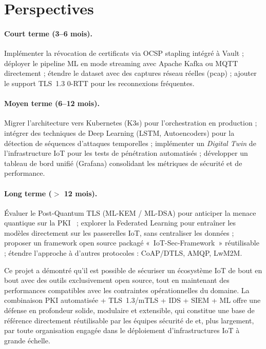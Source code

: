\section*{Perspectives}

\paragraph{Court terme (3--6 mois).}
Implémenter la révocation de certificats via OCSP stapling intégré à Vault ; déployer le pipeline ML en mode streaming avec Apache Kafka ou MQTT directement ; étendre le dataset avec des captures réseau réelles (pcap) ; ajouter le support TLS~1.3 0-RTT pour les reconnexions fréquentes.

\paragraph{Moyen terme (6--12 mois).}
Migrer l'architecture vers Kubernetes (K3s) pour l'orchestration en production ; intégrer des techniques de Deep Learning (LSTM, Autoencoders) pour la détection de séquences d'attaques temporelles ; implémenter un \textit{Digital Twin} de l'infrastructure IoT pour les tests de pénétration automatisés ; développer un tableau de bord unifié (Grafana) consolidant les métriques de sécurité et de performance.

\paragraph{Long terme ($>$ 12 mois).}
Évaluer le Post-Quantum TLS (ML-KEM / ML-DSA) pour anticiper la menace quantique sur la PKI~\cite{rfc9325} ; explorer la Federated Learning pour entraîner les modèles directement sur les passerelles IoT, sans centraliser les données ; proposer un framework open source packagé «~IoT-Sec-Framework~» réutilisable ; étendre l'approche à d'autres protocoles : CoAP/DTLS, AMQP, LwM2M.

\vspace{0.8cm}

Ce projet a démontré qu'il est possible de sécuriser un écosystème IoT de bout en bout avec des outils exclusivement open source, tout en maintenant des performances compatibles avec les contraintes opérationnelles du domaine. La combinaison PKI automatisée + TLS~1.3/mTLS + IDS + SIEM + ML offre une défense en profondeur solide, modulaire et extensible, qui constitue une base de référence directement réutilisable par les équipes sécurité de \TT{} et, plus largement, par toute organisation engagée dans le déploiement d'infrastructures IoT à grande échelle.
